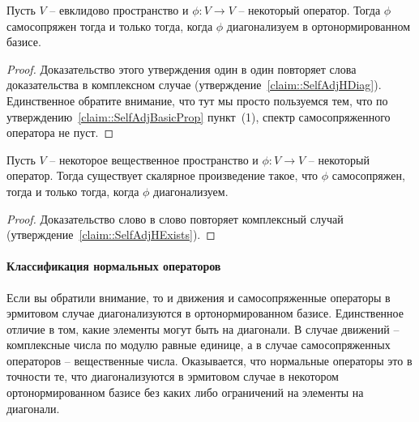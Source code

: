 \begin{claim}
\label{claim::SelfAdjEDiag}
Пусть $V$ -- евклидово пространство и $\phi\colon V\to V$ -- некоторый оператор.
Тогда $\phi$ самосопряжен тогда и только тогда, когда $\phi$ диагонализуем в ортонормированном базисе.
\end{claim}
\begin{proof}
Доказательство этого утверждения один в один повторяет слова доказательства в комплексном случае (утверждение~\ref{claim::SelfAdjHDiag}).
Единственное обратите внимание, что тут мы просто пользуемся тем, что по утверждению~\ref{claim::SelfAdjBasicProp} пункт~(1), спектр самосопряженного оператора не пуст.
\end{proof}

\begin{claim}
Пусть $V$ -- некоторое вещественное пространство и $\phi\colon V\to V$ -- некоторый оператор.
Тогда существует скалярное произведение такое, что $\phi$ самосопряжен, тогда и только тогда, когда $\phi$ диагонализуем.
\end{claim}
\begin{proof}
Доказательство слово в слово повторяет комплексный случай (утверждение~\ref{claim::SelfAdjHExists}).
\end{proof}

\paragraph{Классификация нормальных операторов}

Если вы обратили внимание, то и движения и самосопряженные операторы в эрмитовом случае диагонализуются в ортонормированном базисе.
Единственное отличие в том, какие элементы могут быть на диагонали.
В случае движений -- комплексные числа по модулю равные единице, а в случае самосопряженных операторов -- вещественные числа.
Оказывается, что нормальные операторы это в точности те, что диагонализуются в эрмитовом случае в некотором ортонормированном базисе без каких либо ограничений на элементы на диагонали.

